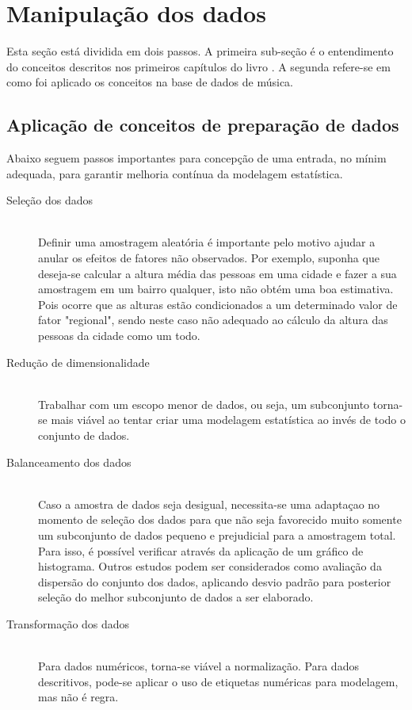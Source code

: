 \documentclass[journal]{IEEEtran}
\begin{document}
\section{Manipulação dos dados}
\label{sec:miner_data}

Esta seção está dividida em dois passos. A primeira sub-seção é o entendimento do conceitos descritos nos primeiros capítulos do livro \cite*{carvalhointeligencia}. A segunda  refere-se em como foi aplicado os conceitos na base de dados de música. 

\subsection{Aplicação de conceitos de preparação de dados}

Abaixo seguem passos importantes para concepção de uma entrada, no mínim adequada, para garantir melhoria contínua da modelagem estatística.

\begin{description}
  
  \item[Seleção dos dados] \hfill \\
  Definir uma amostragem aleatória é importante pelo motivo ajudar a anular os efeitos de fatores não observados. Por exemplo, suponha que deseja-se calcular a altura média das pessoas em uma cidade e fazer a sua amostragem em um bairro qualquer, isto não obtém uma boa estimativa. Pois ocorre que as alturas estão condicionados a um determinado valor de fator "regional", sendo neste caso não adequado ao cálculo da altura das pessoas da cidade como um todo.
  
  \item[Redução de dimensionalidade] \hfill \\
  Trabalhar com um escopo menor de dados, ou seja, um subconjunto torna-se mais viável ao tentar criar uma modelagem estatística ao invés de todo o conjunto de dados.
  
  \item[Balanceamento dos dados] \hfill \\
  Caso a amostra de dados seja desigual, necessita-se uma adaptaçao no momento de seleção dos dados para que não seja favorecido muito somente um subconjunto de dados pequeno e prejudicial para a amostragem total. Para isso, é possível verificar através da aplicação de um gráfico de histograma.  Outros estudos podem ser considerados como avaliação da dispersão do conjunto dos dados, aplicando desvio padrão para posterior seleção do melhor subconjunto de dados a ser elaborado.
  
  \item[Transformação dos dados] \hfill \\
  Para dados numéricos, torna-se viável a normalização. Para dados descritivos, pode-se aplicar o uso de etiquetas numéricas para modelagem, mas não é regra.
  
\end{description}
\end{document}
